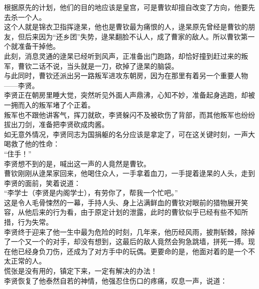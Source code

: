 \begin{multicols}{\theparacolNo}
根据原先的计划，他们的目的地应该是皇宫，可是曹钦却擅自改变了方向，他要先去杀一个人。\\

这个人就是锦衣卫指挥逯杲，他也是曹钦最为痛恨的人，逯杲原先曾经是曹钦的朋友，但后来因为“还乡团”失势，逯杲翻脸不认人，成了曹家的敌人。所以曹钦第一个就准备干掉他。\\

此刻，消息灵通的逯杲已经听到风声，正准备出门跑路，却恰好撞到赶过来的叛军，曹钦二话不说，当头就是一刀，砍掉了逯杲的脑袋。\\

与此同时，曹钦还派出另一路叛军进攻东朝房，因为在那里有着另一个重要人物——李贤。\\

李贤正在朝房里睡大觉，突然听见外面人声鼎沸，心知不妙，准备起身逃跑，却被一拥而入的叛军堵了个正着。\\

叛军也不跟他讲客气，挥刀就砍，李贤躲闪不及被砍伤了背部，而其他叛军也纷纷拔出刀剑，准备把李贤砍成肉酱。\\

如无意外情况，李贤同志为国捐躯的名分应该是拿定了，可在这关键时刻，一声大喝救了他的性命：\\

“住手！”\\

李贤想不到的是，喊出这一声的人竟然是曹钦。\\

曹钦刚刚从逯杲家回来，他喝住众人，一手拿着血刀，一手提着逯杲的人头，走到李贤的面前，笑着说道：\\

“李学士（李贤是内阁学士），有劳你了，帮我一个忙吧。”\\

这是令人毛骨悚然的一幕，手持人头、身上沾满鲜血的曹钦对眼前的猎物展开笑容，从他后来的行为看，由于原定计划的泄露，此时的曹钦似乎已经有些不知所措，行为失常。\\

李贤终于迎来了他一生中最为危险的时刻，几年来，他历经风雨，披荆斩棘，除掉了一个又一个的对手，却没有想到，这最后的敌人竟然会狗急跳墙，拼死一搏。现在他已经身负刀伤，还成为了对方手中的玩偶。更要命的是，他面对着的是一个不太正常的人。\\

慌张是没有用的，镇定下来，一定有解决的办法！\\

李贤恢复了他泰然自若的神情，他强忍住伤口的疼痛，叹息一声，说道：\\


\end{multicols}

